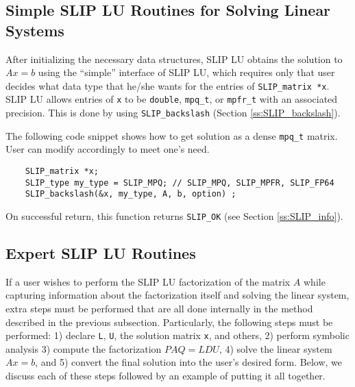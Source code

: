 \documentclass[12pt]{article}
\theoremstyle{definition}
\begin{document}
\cprotect\subsection{Simple SLIP LU Routines for Solving Linear Systems}
\label{s:Using:simple}

After initializing the necessary data structures, SLIP LU obtains the solution
to $A x = b$ using the ``simple'' interface of SLIP LU, which requires only that
user decides what data type that he/she wants for the entries of
\verb|SLIP_matrix *x|. SLIP LU allows entries of \verb|x| to be \verb|double|,
\verb|mpq_t|, or \verb|mpfr_t| with an associated precision.
This is done by using \verb|SLIP_backslash| (Section \ref{ss:SLIP_backslash}).

The following code snippet shows how to get solution as a dense \verb|mpq_t|
matrix. User can modify accordingly to meet one's need.

{\small
\begin{verbatim}
    SLIP_matrix *x;
    SLIP_type my_type = SLIP_MPQ; // SLIP_MPQ, SLIP_MPFR, SLIP_FP64
    SLIP_backslash(&x, my_type, A, b, option) ;
    \end{verbatim} }

On successful return, this function returns \verb|SLIP_OK| (see Section
\ref{ss:SLIP_info}).

\cprotect\subsection{Expert SLIP LU Routines}
\label{s:Using:expert}

If a user wishes to perform the SLIP LU factorization of the matrix $A$ while
capturing information about the factorization itself and solving the linear
system, extra steps must be performed that are all done internally in the
method described in the previous subsection. Particularly, the following steps
must be performed: 1) declare \verb|L|, \verb|U|, the solution matrix
\verb|x|, and others,
2) perform symbolic analysis 3) compute the factorization
$PAQ = L D U$, 4) solve the linear system $Ax =b$, and 5) convert the final
solution into the user's desired form. Below, we discuss each of these steps
followed by an example of putting it all together.
\end{document}
